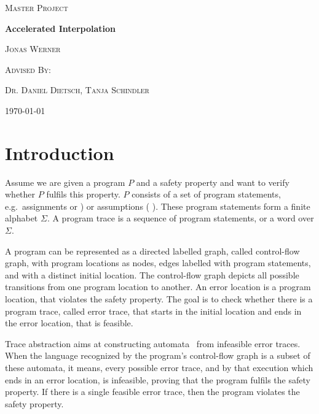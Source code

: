 \documentclass{article}
\newcommand{\tikzstmt}[3]{{%
\tikz[baseline]{%
	\node[st,fill=#2] at (0,.64ex){%
	\hspace{.3em}\texttt{\strut#3#1}\hspace{.3em}\strut};}
}}
\newcommand{\stfootcol}[2]{\tikzstmt{#1}{#2}{\footnotesize}}
\newcommand{\stfoot}[1]{\stfootcol{#1}{stmtcolor}}
\newcommand{\st}[1]{\stfoot{#1}}
\newcommand\mycom[1]{}
\newcommand\mycom[1]{#1}
\newcommand{\dd}[1]{\mycom{\todo[color=orange!40,inline]{\small DD: #1}}}
\newcommand{\ts}[1]{\mycom{\todo[color=green!40,inline]{\small TS: #1}}}
\begin{document}
    \newcommand{\HorizontalLine}{\rule{\linewidth}{0.3mm}}
    
        \begin{center}
        {\scshape\Large Master Project \par}
        \vspace{1.5cm}
        {\huge\bfseries Accelerated Interpolation \par}
        \vspace{1cm}
        {\large \scshape Jonas Werner\par}
        \vspace{0.5cm}
        {\large \scshape Advised By: \par}
        {\large \scshape Dr. Daniel Dietsch, Tanja Schindler \par}
        \vspace{0.5cm}
        {\today \vspace{2cm}} 
        \end{center}

\section{Introduction}
Assume we are given a program $P$ and a safety property and want to verify whether $P$ fulfils this property. 
$P$ consists of a set of program statements, e.g.\ assignments \st{x:=0} or \st{havoc x}) or assumptions (\st{x!=42}).
These program statements form a finite alphabet $\Sigma$. 
A program trace is a sequence of program statements, or a word over $\Sigma$.

A program can be represented as a directed labelled graph, called control-flow graph, with program locations as nodes, edges labelled with program statements, and with a distinct initial location. 
The control-flow graph depicts all possible transitions from one program location to another. 
An error location is a program location, that violates the safety property.\ts{How does a location violate a property? Explain error location. In the beginning, you are given a program and a safety property - how is this connected to the error location?} 
The goal is to check whether there is a program trace, called error trace, that starts in the initial location and ends in the error location, that is feasible. 

Trace abstraction aims at constructing automata~\cite{10.1007/978-3-642-39799-8_2} from infeasible error traces. \dd{Is this a good description of TA?}
When the language recognized by the program's control-flow graph\dd{How can a graph recognize a language?} is a subset of these automata, it means, every possible error trace, and by that execution which ends in an error location, is infeasible\dd{what is an infeasible execution?}, proving that the program fulfils the safety property. 
If there is a single feasible error trace, then the program violates the safety property.\dd{what is another word for feasible? Usually, we need to define (in)feasability before using it, so if you can find a better one the intro up to this point will make more sense}
\end{document}
